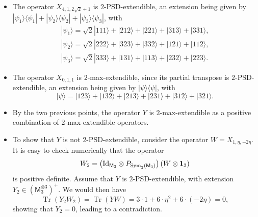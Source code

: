 \documentclass{amsart}
\DeclareMathOperator{\tr}{Tr}
\newcommand{\ketbra}[2]{| #1 \rangle \langle  #2 |}
\newcommand{\M}{\mathsf{M}}
\newcommand{\Id}{\mathrm{Id}}
\def\lb{\left(}
\def\rb{\right)}
\newcommand{\Sym}{\mathrm{Sym}}
\newcommand{\ket}[1]{| #1 \rangle}
\theoremstyle{plain}
\begin{document}
\begin{itemize}
    \item The operator $X_{4,1,2\sqrt{2}+1}$ is $2$-PSD-extendible, an extension being given by $\ketbra{\psi_1}{\psi_1}+\ketbra{\psi_2}{\psi_2}+\ketbra{\psi_3}{\psi_3}$, with
    \begin{align*} \ket{\psi_1} = \sqrt{2} \ket{111} + \ket{212} + \ket{221} + \ket{313} + \ket{331} , \\
    \ket{\psi_2} = \sqrt{2} \ket{222} + \ket{323} + \ket{332} + \ket{121} + \ket{112} ,\\
     \ket{\psi_3} = \sqrt{2} \ket{333} + \ket{131} + \ket{113} + \ket{232} + \ket{223} .
     \end{align*}
    \item The operator $X_{0,1,1}$ is $2$-max-extendible, since its partial transpose is $2$-PSD-extendible, an extension being given by $\ketbra{\psi}{\psi}$, with
    \[ \ket{\psi} =  \ket{123} + \ket{132} + \ket{213} + \ket{231} + \ket{312} + \ket{321}.\]
    \item By the two previous points, the operator $Y$ is $2$-max-extendible as a positive combination of $2$-max-extendible operators.
    \item To show that $Y$ is not 2-PSD-extendible, consider the operator $W = X_{1,\eta,-2\eta}$. It is easy to check numerically that the operator 
    \[ W_2 = \lb\Id_{\M_3} \otimes P_{\Sym_2(\M_3)} \rb (W \otimes {\bf 1}_3) \]
    is positive definite. Assume that $Y$ is $2$-PSD-extendible, with extension $Y_2 \in \lb\M_3^{\otimes 3}\rb^+$. We would then have
    \[ \tr(Y_2W_2)=\tr(YW) = 3 \cdot 1 + 6 \cdot \eta^2 + 6 \cdot (-2\eta) = 0, \]
    showing that $Y_2=0$, leading to a contradiction.
\end{itemize}

{}

\end{document}
